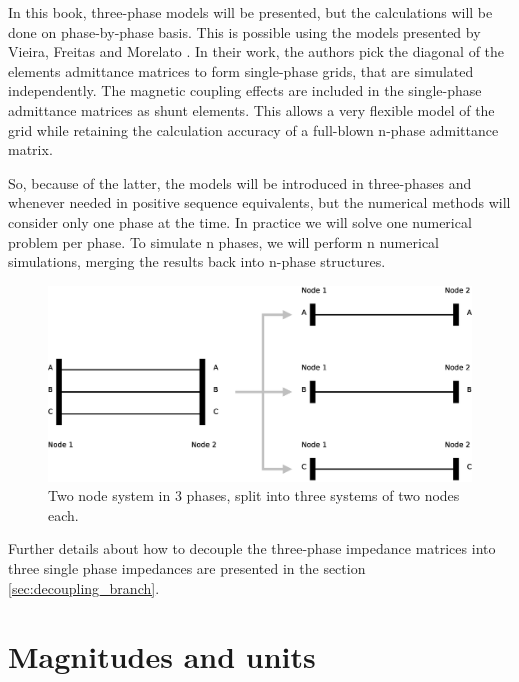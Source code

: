 \documentclass[a4paper,twoside]{tufte-book}
\begin{document}
In this book, three-phase models will be presented, but the calculations will be done on phase-by-phase basis. This is possible using the models presented by Vieira, Freitas and Morelato \cite{vieira2004phase}. In their work, the authors pick the diagonal of the elements admittance matrices to form single-phase grids, that are simulated independently. The magnetic coupling effects are included in the single-phase admittance matrices as shunt elements. This allows a very flexible model of the grid while retaining the calculation accuracy of a full-blown n-phase admittance matrix.

So, because of the latter, the models will be introduced in three-phases and whenever needed in positive sequence equivalents, but the numerical methods will consider only one phase at the time. In practice we will solve one numerical problem per phase. To simulate n phases, we will perform n numerical simulations, merging the results back into n-phase structures.

\begin{figure}
  \includegraphics[width=\linewidth]{img/3p_to_1p.eps}
  \caption{Two node system in 3 phases, split into three systems of two nodes each.}
  \label{fig:3p_to_1p}
\end{figure}

Further details about how to decouple the three-phase impedance matrices into three single phase impedances are presented in the section \ref{sec:decoupling_branch}.

\chapter{Magnitudes and units}
\end{document}

